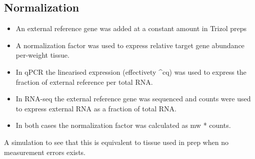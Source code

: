\documentclass[twoside,10pt]{gihclass} %
\newenvironment{Shaded}{\begin{snugshade}}{\end{snugshade}}
\newcommand{\DataTypeTok}[1]{\textcolor[rgb]{0.13,0.29,0.53}{#1}}
\newcommand{\DecValTok}[1]{\textcolor[rgb]{0.00,0.00,0.81}{#1}}
\newcommand{\FloatTok}[1]{\textcolor[rgb]{0.00,0.00,0.81}{#1}}
\newcommand{\KeywordTok}[1]{\textcolor[rgb]{0.13,0.29,0.53}{\textbf{#1}}}
\newcommand{\NormalTok}[1]{#1}
\newcommand{\OperatorTok}[1]{\textcolor[rgb]{0.81,0.36,0.00}{\textbf{#1}}}
\newcommand{\StringTok}[1]{\textcolor[rgb]{0.31,0.60,0.02}{#1}}
\providecommand{\tightlist}{%
  \setlength{\itemsep}{0pt}\setlength{\parskip}{0pt}}
\begin{document}
\hypertarget{normalization}{%
\subsection{Normalization}\label{normalization}}
\begin{itemize}
\tightlist
\item
  An external reference gene was added at a constant amount in Trizol preps
\item
  A normalization factor was used to express relative target gene abundance per-weight tissue.
\item
  In qPCR the linearised expression (effectivety \^{}cq) was used to express the fraction of external reference per total RNA.
\item
  In RNA-seq the external reference gene was sequenced and counts were used to express external RNA as a fraction of total RNA.
\item
  In both cases the normalization factor was calculated as mw * counts.
\end{itemize}
A simulation to see that this is equivalent to tissue used in prep when no measurement errors exists.
\begin{Shaded}
\end{Shaded}
\end{document}
